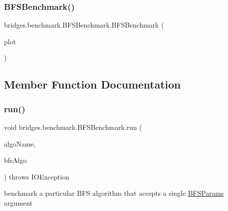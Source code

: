 \mbox{\label{classbridges_1_1benchmark_1_1_b_f_s_benchmark_afe4a4dd46295e41c1cb7ee25c616a2c9}} 
\subsubsection{\texorpdfstring{B\+F\+S\+Benchmark()}{BFSBenchmark()}\hspace{0.1cm}{\footnotesize\ttfamily [2/2]}}
{\footnotesize\ttfamily bridges.\+benchmark.\+B\+F\+S\+Benchmark.\+B\+F\+S\+Benchmark (\begin{DoxyParamCaption}\item[{\hyperlink{classbridges_1_1base_1_1_line_chart}{Line\+Chart}}]{plot }\end{DoxyParamCaption})}



\subsection{Member Function Documentation}
\mbox{\label{classbridges_1_1benchmark_1_1_b_f_s_benchmark_a0f530ad46a8a379b86285e0efcf8d51c}} 
\subsubsection{\texorpdfstring{run()}{run()}}
{\footnotesize\ttfamily void bridges.\+benchmark.\+B\+F\+S\+Benchmark.\+run (\begin{DoxyParamCaption}\item[{String}]{algo\+Name,  }\item[{Consumer$<$ \hyperlink{classbridges_1_1benchmark_1_1_b_f_s_params}{B\+F\+S\+Params} $>$}]{bfs\+Algo }\end{DoxyParamCaption}) throws I\+O\+Exception}



benchmark a particular B\+FS algorithm that accepts a single \hyperlink{classbridges_1_1benchmark_1_1_b_f_s_params}{B\+F\+S\+Params} argument 


